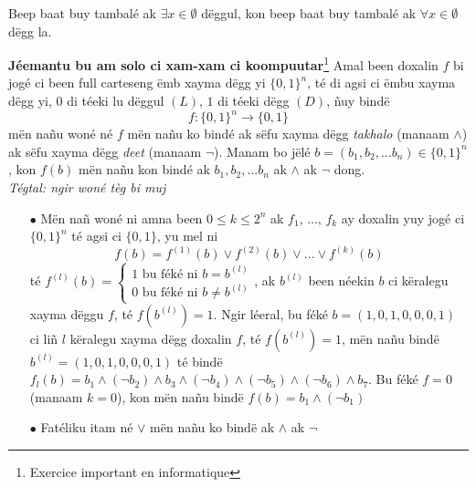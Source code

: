 \documentclass[twoside, a4paper]{article}
\begin{document}
\begin{tcolorbox}[enhanced jigsaw,breakable,pad at break*=1mm, colback=orange!5!white,colframe=white!75!black,title= Waxanté\footnote{Convention},
  watermark color=white]
Beep baat buy tambalé ak $\exists x \in \emptyset$ dëggul, kon beep baat buy tambalé ak $\forall x \in \emptyset$ dëgg la. 
\end{tcolorbox}

\textbf{Jéemantu bu am solo ci xam-xam ci koompuutar}\footnote{Exercice important en informatique}
Amal been doxalin $f$ bi jogé ci been full carteseng ëmb xayma dëgg yi $\{0,1\}^n$, té di agsi ci ëmbu xayma dëgg yi, $0$ di téeki lu dëggul $(L)$,  $1$ di téeki dëgg $(D)$, ñuy bindë
$$f: \{0,1\}^n \rightarrow \{0,1\}$$
mën nañu woné né $f$ mën nañu ko bindé ak sëfu xayma dëgg \textit{takhalo} (manaam $\land$) ak sëfu xayma dëgg \textit{deet} (manaam $\neg$). Manam bo jëlé $b = (b_1,b_2,...b_n) \in \{0,1\}^n$, kon $f(b)$ mën nañu kon bindé ak $b_1,b_2,...b_n$ ak $\land$ ak $\neg$ dong.\\
\textit{Tégtal: ngir woné tèg bi muj}
\begin{itemize}
    \item[$\bullet$] Mën nañ woné ni amna been $0\leq k \leq 2^n$ ak $f_1$, ..., $f_k$ ay doxalin yuy jogé ci $\{0,1\}^n$ té agsi ci $\{0,1\}$, yu mel ni $$f(b) = f^{(1)}(b) \lor f^{(2)}(b) \lor ... \lor f^{(k)}(b)$$ té $f^{(l)}(b) = \left\{\begin{array}{ll}
        1 \text{ bu féké ni $b=b^{(l)}$}\\
        0 \text{ bu féké ni $b\neq b^{(l)}$}
    \end{array}\right.$, ak $b^{(l)}$ been néekin $b$ ci këralegu xayma dëggu $f$, té $f(b^{(l)}) = 1$. Ngir léeral, bu féké $b=(1,0,1,0,0,0,1)$ ci liñ $l$ këralegu xayma dëgg doxalin $f$, té $f(b^{(l)}) = 1$, mën nañu bindë $b^{(l)} = (1,0,1,0,0,0,1)$ té bindë $f_l(b) = b_1 \land (\neg b_2) \land b_3 \land (\neg b_4) \land (\neg b_5) \land (\neg b_6) \land  b_7 $. Bu féké $f = 0$ (manaam $k=0$), kon mën nañu bindë $f(b)=b_1 \land (\neg b_1)$
    \item[$\bullet$] Fatéliku itam né $\lor$ mën nañu ko bindë ak $\land$ ak $\neg$
\end{itemize}
\end{document}
